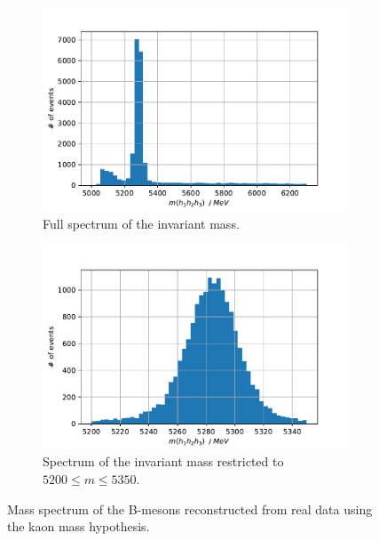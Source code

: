 \begin{figure}[H]
    \centering
    \begin{subfigure}{0.49\textwidth}
      \includegraphics[width=\textwidth]{plots/mass_B.pdf}
      \caption{Full spectrum of the invariant mass.}
      \label{fig:ProbPi}
    \end{subfigure}
    \begin{subfigure}{0.49\textwidth}
      \includegraphics[width=\textwidth]{plots/masspeak_B.pdf}
      \caption{Spectrum of the invariant mass restricted to $5200 \leq m \leq 5350$.}
      \label{f4b}
    \end{subfigure}
    \caption{Mass spectrum of the B-mesons reconstructed from real data using the kaon mass hypothesis.}
    \label{f4}
\end{figure}

